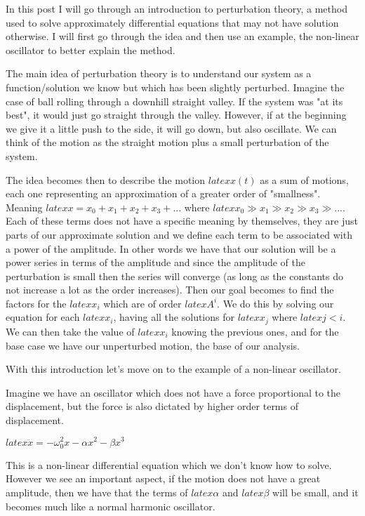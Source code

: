 In this post I will go through an introduction to perturbation theory, a method used to solve approximately differential equations that may not have solution otherwise. I will first go through the idea and then use an example, the non-linear oscillator to better explain the method.

The main idea of perturbation theory is to understand our system as a function/solution we know but which has been slightly perturbed. Imagine the case of ball rolling through a downhill straight valley. If the system was "at its best", it would just go straight through the valley. However, if at the beginning we give it a little push to the side, it will go down, but also oscillate. We can think of the motion as the straight motion plus a small perturbation of the system.



The idea becomes then to describe the motion $latex x(t)$ as a sum of motions, each one representing an approximation of a greater order of "smallness". Meaning $latex x = x_0 + x_1 + x_2 + x_3 + ...$ where $latex x_0 \gg x_1 \gg x_2 \gg x_3 \gg ...$. Each of these terms does not have a specific meaning by themselves, they are just parts of our approximate solution and we define each term to be associated with a power of the amplitude. In other words we have that our solution will be a power series in terms of the amplitude and since the amplitude of the perturbation is small then the series will converge (as long as the constants do not increase a lot as the order increases). Then our goal becomes to find the factors for the $latex x_i $ which are of order $latex A^i $. We do this by solving our equation for each $latex x_i $, having all the solutions for $latex x_j$ where $latex j<i $. We can then take the value of $latex x_i$ knowing the previous ones, and for the base case we have our unperturbed motion, the base of our analysis.

With this introduction let's move on to the example of a non-linear oscillator.

Imagine we have an oscillator which does not have a force proportional to the displacement, but the force is also dictated by higher order terms of displacement.

$latex \ddot x = -\omega_0^2 x -\alpha x^2 - \beta x^3 $

This is a non-linear differential equation which we don't know how to solve. However we see an important aspect, if the motion does not have a great amplitude, then we have that the terms of $latex \alpha$ and $latex \beta$ will be small, and it becomes much like a normal harmonic oscillator.

